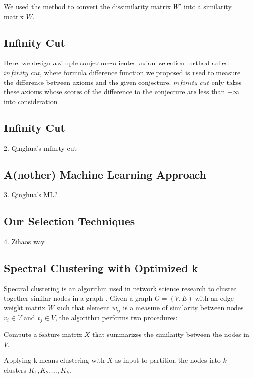 \documentclass[EPiC]{easychair}
\newenvironment{packed_enumerate}{
\vspace*{-0.5em}
\begin{enumerate}
  \setlength{\partopsep}{0pt}
  \setlength{\itemsep}{1pt}
  \setlength{\parskip}{0pt}
  \setlength{\parsep}{0pt}
}{\end{enumerate}}
\begin{document}
We used the method to convert the dissimilarity matrix $W'$ into a similarity
matrix $W$. 

\subsection{Infinity Cut}
\label{QinghuaInf}

Here, we design a simple conjecture-oriented axiom selection method called 
$infinity$ $cut$, where formula difference function we proposed is used to 
measure the difference between axioms and the given conjecture. 
$infinity$ $cut$ only takes these axioms whose scores of the difference 
to the conjecture are less than $+\infty$ into consideration.

\subsection{Infinity Cut}
\label{QinghuaInf}

2. Qinghua's infinity cut
\subsection{A(nother) Machine Learning Approach}
\label{QinghuaML}

3. Qinghua's ML?
\subsection{Our Selection Techniques}
\label{Zihao}

4. Zihaos way
\subsection{Spectral Clustering with Optimized k}
\label{Zishi}

Spectral clustering is an algorithm used in network science research to
cluster together similar nodes in a graph \cite{vLu07}. 
Given a graph $G = (V, E)$ with an edge weight matrix $W$ such that element
$w_{ij}$ is a measure of similarity between nodes $v_{i} \in V$ and 
$v_{j} \in V$, the algorithm performs two procedures:
\begin{packed_enumerate}
\item Compute a feature matrix $X$ that summarizes the similarity between 
      the nodes in $V$.
\item Applying k-means clustering \cite{} with $X$ as input to partition the 
      nodes into $k$ clusters $K_{1}, K_{2}, ..., K_{k}$.
\end{packed_enumerate}
\end{document}
